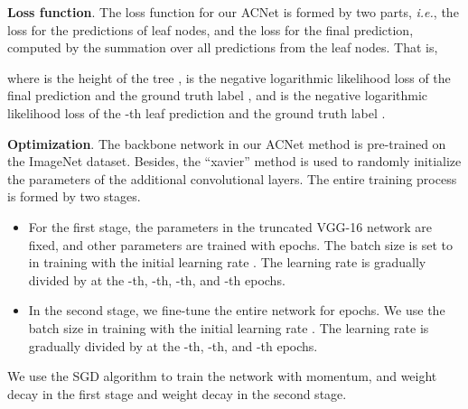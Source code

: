 \documentclass[10pt,twocolumn,letterpaper]{article}
\def\ie{{\em i.e.}}
\begin{document}
{\flushleft \textbf{Loss function}.} The loss function for our ACNet is formed by two parts, \ie, the loss for the predictions of leaf nodes, and the loss for the final prediction, computed by the summation over all predictions from the leaf nodes. That is,

where  is the height of the tree ,  is the negative logarithmic likelihood loss of the final prediction  and the ground truth label , and  is the negative logarithmic likelihood loss of the -th leaf prediction and the ground truth label .

{\flushleft \textbf{Optimization}.}
The backbone network in our ACNet method is pre-trained on the ImageNet dataset. Besides, the ``xavier'' method \cite{DBLP:journals/jmlr/GlorotB10} is used to randomly initialize the parameters of the additional convolutional layers. The entire training process is formed by two stages. 
\begin{itemize}
\item For the first stage, the parameters in the truncated VGG-16 network are fixed, and other parameters are trained with  epochs. The batch size is set to  in training with the initial learning rate . The learning rate is gradually divided by  at the -th, -th, -th, and -th epochs. 
\item In the second stage, we fine-tune the entire network for  epochs. We use the batch size  in training with the initial learning rate . The learning rate is gradually divided by  at the -th, -th, and -th epochs. 
\end{itemize}
We use the SGD algorithm to train the network with  momentum, and  weight decay in the first stage and  weight decay in the second stage.
\end{document}
